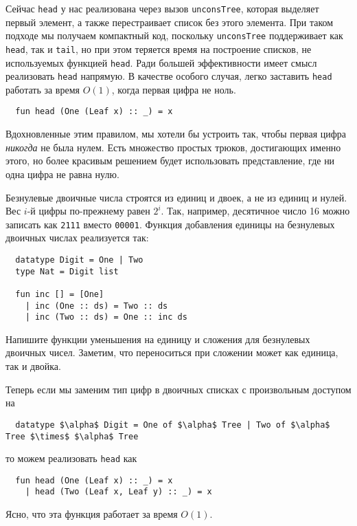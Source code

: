 Сейчас \lstinline!head! у нас реализована через вызов
\lstinline!unconsTree!, которая выделяет первый элемент, а также
перестраивает список без этого элемента. При таком подходе мы получаем
компактный код, поскольку \lstinline!unconsTree! поддерживает как
\lstinline!head!, так и \lstinline!tail!, но при этом теряется время
на построение списков, не используемых функцией
\lstinline!head!. Ради большей эффективности имеет смысл реализовать
\lstinline!head! напрямую. В качестве особого случая, легко заставить
\lstinline!head! работать за время $O(1)$, когда первая цифра не ноль.
\begin{lstlisting}
  fun head (One (Leaf x) :: _) = x
\end{lstlisting}
Вдохновленные этим правилом, мы хотели бы устроить так, чтобы первая
цифра \emph{никогда} не была нулем. Есть множество простых трюков,
достигающих именно этого, но более красивым решением будет
использовать  представление, где ни одна
цифра не равна нулю.

Безнулевые двоичные числа строятся из единиц и двоек, а не из единиц и
нулей. Вес $i$-й цифры по-прежнему равен $2^i$. Так, например,
десятичное число 16 можно записать как \texttt{2111} вместо
\texttt{00001}. Функция добавления единицы на безнулевых двоичных
числах реализуется так:
\begin{lstlisting}
  datatype Digit = One | Two
  type Nat = Digit list

  fun inc [] = [One]
    | inc (One :: ds) = Two :: ds
    | inc (Two :: ds) = One :: inc ds
\end{lstlisting}

\begin{exercise}\label{ex:9.4}
  Напишите функции уменьшения на единицу и сложения для безнулевых
  двоичных чисел. Заметим, что переноситься при сложении может как
  единица, так и двойка.
\end{exercise}

Теперь если мы заменим тип цифр в двоичных списках с произвольным
доступом на
\begin{lstlisting}
  datatype $\alpha$ Digit = One of $\alpha$ Tree | Two of $\alpha$ Tree $\times$ $\alpha$ Tree
\end{lstlisting}
то можем реализовать \lstinline!head! как
\begin{lstlisting}
  fun head (One (Leaf x) :: _) = x
    | head (Two (Leaf x, Leaf y) :: _) = x
\end{lstlisting}
Ясно, что эта функция работает за время $O(1)$.

